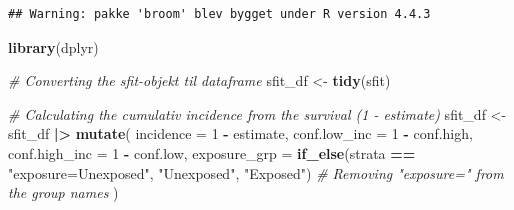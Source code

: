 \documentclass[
]{article}
\newenvironment{Shaded}{\begin{snugshade}}{\end{snugshade}}
\newcommand{\AttributeTok}[1]{\textcolor[rgb]{0.13,0.29,0.53}{#1}}
\newcommand{\CommentTok}[1]{\textcolor[rgb]{0.56,0.35,0.01}{\textit{#1}}}
\newcommand{\DecValTok}[1]{\textcolor[rgb]{0.00,0.00,0.81}{#1}}
\newcommand{\FunctionTok}[1]{\textcolor[rgb]{0.13,0.29,0.53}{\textbf{#1}}}
\newcommand{\NormalTok}[1]{#1}
\newcommand{\OtherTok}[1]{\textcolor[rgb]{0.56,0.35,0.01}{#1}}
\newcommand{\SpecialCharTok}[1]{\textcolor[rgb]{0.81,0.36,0.00}{\textbf{#1}}}
\newcommand{\StringTok}[1]{\textcolor[rgb]{0.31,0.60,0.02}{#1}}
\begin{document}
\begin{verbatim}
## Warning: pakke 'broom' blev bygget under R version 4.4.3
\end{verbatim}

\begin{Shaded}
\begin{Highlighting}[]
\FunctionTok{library}\NormalTok{(dplyr)}

\CommentTok{\# Converting the sfit{-}objekt til dataframe }
\NormalTok{  sfit\_df }\OtherTok{\textless{}{-}} \FunctionTok{tidy}\NormalTok{(sfit)}

\CommentTok{\# Calculating the cumulativ incidence from the survival (1 {-} estimate)}
\NormalTok{sfit\_df }\OtherTok{\textless{}{-}}\NormalTok{ sfit\_df }\SpecialCharTok{|\textgreater{}} 
  \FunctionTok{mutate}\NormalTok{(}
    \AttributeTok{incidence =} \DecValTok{1} \SpecialCharTok{{-}}\NormalTok{ estimate,}
    \AttributeTok{conf.low\_inc =} \DecValTok{1} \SpecialCharTok{{-}}\NormalTok{ conf.high, }
    \AttributeTok{conf.high\_inc =} \DecValTok{1} \SpecialCharTok{{-}}\NormalTok{ conf.low,}
    \AttributeTok{exposure\_grp =} \FunctionTok{if\_else}\NormalTok{(strata }\SpecialCharTok{==} \StringTok{"exposure=Unexposed"}\NormalTok{, }\StringTok{"Unexposed"}\NormalTok{, }\StringTok{"Exposed"}\NormalTok{)   }\CommentTok{\# Removing "exposure=" from the group names}
\NormalTok{  )}


\end{Highlighting}
\end{Shaded}
\end{document}
